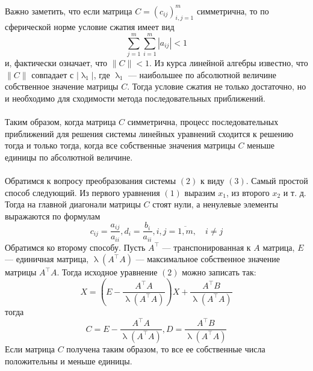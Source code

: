 \documentclass[a4paper, 12pt]{report}
\renewcommand{\lambda}{\uplambda}
\begin{document}
	Важно заметить, что если матрица $C=\left(c_{i j}\right)_{i, j=1}^{m}$ симметрична, то по сферической норме условие сжатия имеет вид
	$$
	\sum_{j=1}^{m} \sum_{i=1}^{m}\left|a_{i j}\right|<1
	$$
	и, фактически означает, что $\|C\|<1$. Из курса линейной алгебры известно, что $\|C\|$ совпадает с $\left|\lambda_{1}\right|$, где $\lambda_{1}$ --- наибольшее по абсолютной величине собственное значение матрицы $C$. Тогда условие сжатия не только достаточно, но и необходимо для сходимости метода последовательных приближений.\\\\
	Таким образом, когда матрица $C$ симметрична, процесс последовательных приближений для решения системы линейных уравнений сходится к решению тогда и только тогда, когда все собственные значения матрицы $C$ меньше единицы по абсолютной величине.\\\\
	Обратимся к вопросу преобразования системы $(2)$ к виду $(3)$.
	Самый простой способ следующий. Из первого уравнения $(1)$ выразим $x_{1}$, из второго $x_{2}$ и т. д. Тогда на главной диагонали матрицы $C$ стоят нули, а ненулевые элементы выражаются по формулам
	$$
	c_{i j}=\frac{a_{i j}}{a_{i i}}, d_{i}=\frac{b_{i}}{a_{i i}}, i, j=\overline{1, m},\quad i \neq j
	$$
	Обратимся ко второму способу. Пусть $A^{\top}$ --- транспонированная к $A$ матрица, $E$ --- единичная матрица, $\lambda\left(A^{\top} A\right)$ --- максимальное собственное значение матрицы $A^{\top} A$. Тогда исходное уравнение $(2)$ можно записать так:
	$$
	X=\left(E-\frac{A^{\top} A}{\lambda\left(A^{\top} A\right)}\right) X+\frac{A^{\top} B}{\lambda\left(A^{\top} A\right)}
	$$
	тогда
	$$
	C=E-\frac{A^{\top} A}{\lambda\left(A^{\top} A\right)}, D=\frac{A^{\top} B}{\lambda\left(A^{\top} A\right)}
	$$
	Если матрица $C$ получена таким образом, то все ее собственные числа положительны и меньше единицы.
\end{document}
